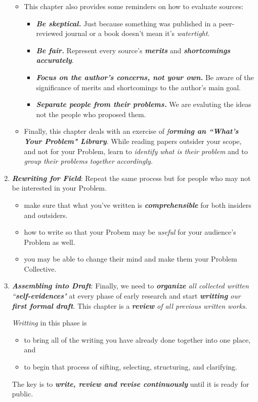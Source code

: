 \documentclass[11pt]{article}
\begin{document}
\begin{enumerate}
\begin{itemize}
\item This chapter also provides some reminders on how to evaluate sources:
\begin{itemize}
\item \emph{\textbf{Be skeptical.}} Just because something was published in a peer-reviewed journal or a book doesn’t mean it's \emph{watertight}.  
\item \emph{\textbf{Be fair.}} Represent every source's \emph{\textbf{merits}} and \emph{\textbf{shortcomings}} \emph{\textbf{accurately}}.
\item \emph{\textbf{Focus on the author's concerns, not your own.}} Be aware of the significance of merits and shortcomings to the author's main goal. 
\item \emph{\textbf{Separate people from their problems.}} We are evaluting the ideas not the people who proposed them.
\end{itemize} 

\item Finally, this chapter deals with an exercise of \emph{f\textbf{orming an ``What's Your Problem" Library}}. While reading papers outsider your scope, and not for your Problem, learn to \emph{identify what is their problem}  and to \emph{group their problems together accordingly}. 
\end{itemize}

\item  \emph{\textbf{Rewriting for Field}}: Repeat the same process but for people who may not be interested in your Problem. 
\begin{itemize}
\item make sure that what you’ve written is \emph{\textbf{comprehensible}} for both insiders and outsiders.

\item how to write so that your Probem may be \emph{useful} for your audience's Problem as well.

\item you may be able to change their mind and make them your Problem Collective.
\end{itemize}

\item  \emph{\textbf{Assembling into Draft}}: Finally, we need to \emph{\textbf{organize} all collected written ``\textbf{self-evidences}"} at every phase of early research and start \emph{\textbf{writting} our \textbf{first formal draft}}. This chapter is a \emph{\textbf{review} of all previous written works}. 

\emph{Writting} in this phase is 
\begin{itemize}
\item to bring all of the writing you have already done together into one place, and 
\item to begin that process of sifting, selecting, structuring, and clarifying.
\end{itemize}

The key is to \emph{\textbf{write, review and revise continuously}} until it is ready for public.
\end{enumerate}
\end{document}
